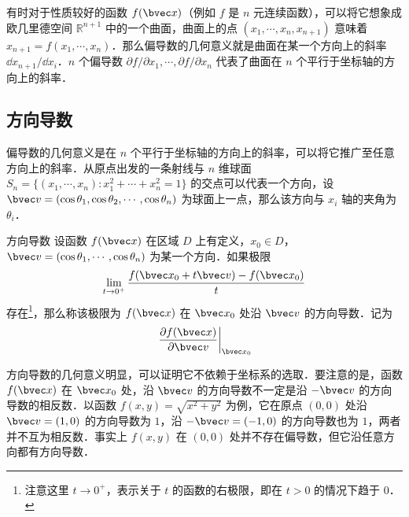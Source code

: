 有时对于性质较好的函数 $f(\bvec x)$（例如 $f$ 是 $n$ 元连续函数），可以将它想象成欧几里德空间 $\mathbb{R}^{n+1}$ 中的一个曲面，曲面上的点 $(x_1,\cdots,x_n,x_{n+1})$ 意味着 $x_{n+1}=f(x_1,\cdots,x_n)$．那么偏导数的几何意义就是曲面在某一个方向上的斜率 $\dd x_{n+1}/\dd x_i$．$n$ 个偏导数 $\partial f/\partial x_1,\cdots,\partial f/\partial x_n$ 代表了曲面在 $n$ 个平行于坐标轴的方向上的斜率．

\subsection{方向导数}
偏导数的几何意义是在 $n$ 个平行于坐标轴的方向上的斜率，可以将它推广至任意方向上的斜率．从原点出发的一条射线与 $n$ 维球面 $S_n=\{(x_1,\cdots,x_n):x_1^2+\cdots+x_n^2=1\}$ 的交点可以代表一个方向，设 $\bvec v=(\cos \theta_1,\cos\theta_2,\cdots,\cos\theta_n)$ 为球面上一点，那么该方向与 $x_i$ 轴的夹角为 $\theta_i$．
\begin{definition}{方向导数}
设函数 $f(\bvec x)$ 在区域 $D$ 上有定义，$x_0\in D$，$\bvec v=(\cos \theta_1,\cdots,\cos\theta_n)$ 为某一个方向．如果极限
\begin{equation}
\lim\limits_{t\rightarrow 0^+}\frac{f(\bvec x_0+t\bvec v)-f(\bvec x_0)}{t}
\end{equation}
存在\footnote{注意这里 $t\rightarrow 0^+$，表示关于 $t$ 的函数的右极限，即在 $t>0$ 的情况下趋于 $0$．}，那么称该极限为 $f(\bvec x)$ 在 $\bvec x_0$ 处沿 $\bvec v$ 的方向导数．记为
\begin{equation}
\left.\frac{\partial f(\bvec x)}{\partial \bvec v}\right|_{\bvec x_0}
\end{equation}
\end{definition}

方向导数的几何意义明显，可以证明它不依赖于坐标系的选取．要注意的是，函数 $f(\bvec x)$ 在 $\bvec x_0$ 处，沿 $\bvec v$ 的方向导数不一定是沿 $-\bvec v$ 的方向导数的相反数．以函数 $f(x,y)=\sqrt{x^2+y^2}$ 为例，它在原点 $(0,0)$ 处沿 $\bvec v=(1,0)$ 的方向导数为 $1$，沿 $-\bvec v=(-1,0)$ 的方向导数也为 $1$，两者并不互为相反数．事实上 $f(x,y)$ 在 $(0,0)$ 处并不存在偏导数，但它沿任意方向都有方向导数．